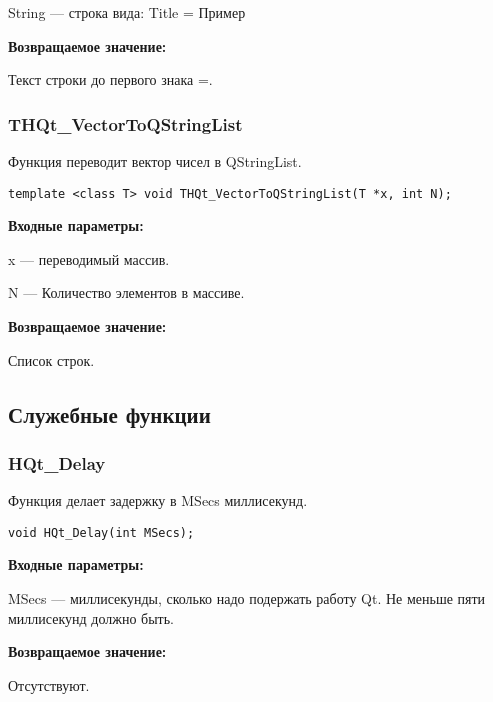 \documentclass[a4paper,12pt]{article}
\begin{document}
String --- строка вида: Title = Пример

\textbf{Возвращаемое значение:}

Текст строки до первого знака =.


\subsubsection{THQt\_VectorToQStringList}\label{THQt_VectorToQStringList}

Функция переводит вектор чисел в QStringList.


\begin{lstlisting}[label=code_syntax_THQt_VectorToQStringList,caption=Синтаксис]
template <class T> void THQt_VectorToQStringList(T *x, int N);
\end{lstlisting}

\textbf{Входные параметры:}

x --- переводимый массив.

     N --- Количество элементов в массиве.

\textbf{Возвращаемое значение:}
 
Список строк.


\subsection{Служебные функции}

\subsubsection{HQt\_Delay}\label{HQt_Delay}

Функция делает задержку в MSecs миллисекунд.


\begin{lstlisting}[label=code_syntax_HQt_Delay,caption=Синтаксис]
void HQt_Delay(int MSecs);
\end{lstlisting}

\textbf{Входные параметры:}

MSecs --- миллисекунды, сколько надо подержать работу Qt. Не меньше пяти миллисекунд должно быть.

\textbf{Возвращаемое значение:}

Отсутствуют.
\end{document}
